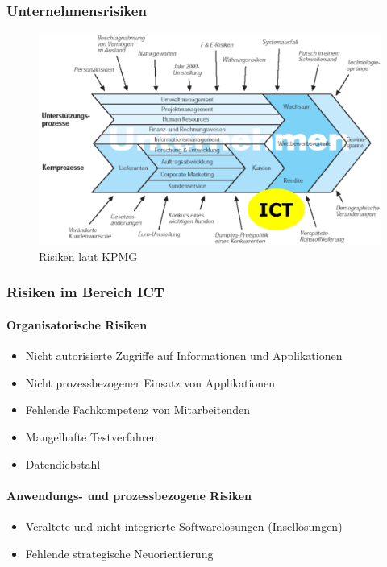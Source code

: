 \documentclass[10pt,a4paper]{article}
\begin{document}
\subsubsection*{Unternehmensrisiken}
\begin{figure}[H]
    \begin{center}
    \includegraphics[width=13cm]{images/KPMG_Risiken.png}
    \caption{Risiken laut KPMG}
    \label{KPMG Unternehmensrisiken}
    \end{center}
\end{figure}

\subsubsection*{Risiken im Bereich ICT}
\paragraph*{Organisatorische Risiken}
\begin{itemize}[noitemsep,topsep=0pt,leftmargin=*]
    \item Nicht autorisierte Zugriffe auf Informationen und
    Applikationen
    \item Nicht prozessbezogener Einsatz von Applikationen
    \item Fehlende Fachkompetenz von Mitarbeitenden
    \item Mangelhafte Testverfahren
    \item Datendiebstahl
\end{itemize}

\paragraph*{Anwendungs- und prozessbezogene Risiken}
\begin{itemize}[noitemsep,topsep=0pt,leftmargin=*]
    \item Veraltete und nicht integrierte Softwarelösungen
    (Insellösungen)
    \item Fehlende strategische Neuorientierung
\end{itemize}
\end{document}

